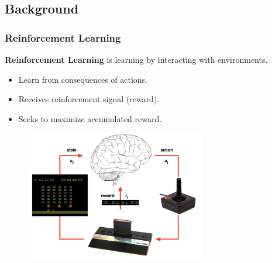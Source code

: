 \documentclass[10pt,mathserif]{beamer}
\begin{document}
\subsection{Background} %

\begin{frame}
\frametitle{Reinforcement Learning}
  \textbf{Reinforcement Learning} is learning by interacting with environments.

  \begin{itemize} \itemsep=6pt
      \item Learn from consequences of actions.
      \item Receives reinforcement signal (reward).
      \item Seeks to maximize accumulated reward.
  \end{itemize}
  \begin{figure}[h]
        \centering
          \includegraphics[width=0.7\textwidth]{emi_figures/mk_intro}
  \end{figure}
\end{frame}

\end{document}
